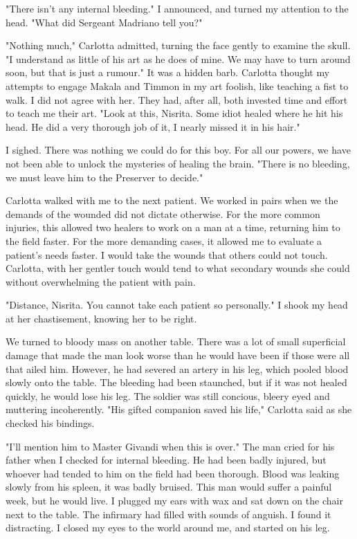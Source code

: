\documentclass{article}
\begin{document}
"There isn't any internal bleeding." I announced, and turned my attention to the head. "What did Sergeant Madriano tell you?"

"Nothing much," Carlotta admitted, turning the face gently to examine the skull. "I understand as little of his art as he does of mine. We may have to turn around soon, but that is just a rumour." It was a hidden barb. Carlotta thought my attempts to engage Makala and Timmon in my art foolish, like teaching a fist to walk. I did not agree with her. They had, after all, both invested time and effort to teach me their art. "Look at this, Nisrita. Some idiot healed where he hit his head. He did a very thorough job of it, I nearly missed it in his hair."

I sighed. There was nothing we could do for this boy. For all our powers, we have not been able to unlock the mysteries of healing the brain. "There is no bleeding, we must leave him to the Preserver to decide."

Carlotta walked with me to the next patient. We worked in pairs when we the demands of the wounded did not dictate otherwise. For the more common injuries, this allowed two healers to work on a man at a time, returning him to the field faster. For the more demanding cases, it allowed me to evaluate a patient's needs faster. I would take the wounds that others could not touch. Carlotta, with her gentler touch would tend to what secondary wounds she could without overwhelming the patient with pain. 

"Distance, Nisrita. You cannot take each patient so personally." I shook my head at her chastisement, knowing her to be right. 

We turned to bloody mass on another table. There was a lot of small superficial damage that made the man look worse than he would have been if those were all that ailed him. However, he had severed an artery in his leg, which pooled blood slowly onto the table. The bleeding had been staunched, but if it was not healed quickly, he would lose his leg. The soldier was still concious, bleery eyed and muttering incoherently. "His gifted companion saved his life," Carlotta said as she checked his bindings.

"I'll mention him to Master Givandi when this is over." The man cried for his father when I checked for internal bleeding. He had been badly injured, but whoever had tended to him on the field had been thorough. Blood was leaking slowly from his spleen, it was badly bruised. This man would suffer a painful week, but he would live. I plugged my ears with wax and sat down on the chair next to the table. The infirmary had filled with sounds of anguish. I found it distracting. I closed my eyes to the world around me, and started on his leg. 
\end{document}
